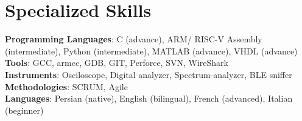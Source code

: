 \documentclass[letterpaper,11pt]{article}
\begin{document}
\section{Specialized Skills}
\begin{itemize}[leftmargin=0.15in, label={}]
    \normalsize{\item{
     \textbf{Programming Languages}{: C (advance), ARM/ RISC-V Assembly (intermediate), Python (intermediate), MATLAB (advance), VHDL (advance)} \\
     \textbf{Tools}{: GCC, armcc, GDB, GIT, Perforce, SVN, WireShark} \\
     \textbf{Instruments}{: Osciloscope, Digital analyzer, Spectrum-analyzer, BLE sniffer} \\
     \textbf{Methodologies}{: SCRUM, Agile} \\
     \textbf{Languages}{: Persian (native), English (bilingual), French (advanced), Italian (beginner)}\\
    }}
 \end{itemize}
\end{document}
